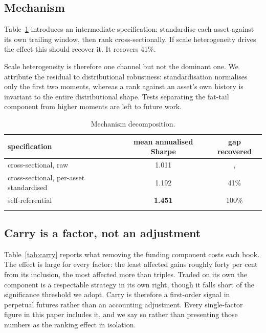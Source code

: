 \documentclass[11pt,letterpaper]{article}
\begin{document}
\subsection{Mechanism}

Table~\ref{tab:mech} introduces an intermediate specification: standardise each
asset against its own trailing window, then rank cross-sectionally. If scale
heterogeneity drives the effect this should recover it. It recovers 41\%.

Scale heterogeneity is therefore one channel but not the dominant one. We
attribute the residual to distributional robustness: standardisation normalises
only the first two moments, whereas a rank against an asset's own history is
invariant to the entire distributional shape. Tests separating the fat-tail
component from higher moments are left to future work.

\begin{table}[!htbp]\centering
\caption{Mechanism decomposition.}\label{tab:mech}
\begin{tabular}{lcc}
\toprule
specification & mean annualised Sharpe & gap recovered \\
\midrule\addlinespace[2pt]
cross-sectional, raw & 1.011 & , \\
cross-sectional, per-asset standardised & 1.192 & 41\% \\
self-referential & \textbf{1.451} & 100\% \\
\addlinespace[2pt]
\bottomrule
\end{tabular}
\end{table}

\subsection{Carry is a factor, not an adjustment}
\label{sec:carry}

Table~\ref{tab:carry} reports what removing the funding component costs each
book. The effect is large for every factor: the least affected gains roughly
forty per cent from its inclusion, the most affected more than triples. Traded on its own the component is a respectable strategy in its own right,
though it falls short of the significance threshold we adopt. Carry is therefore
a first-order signal in perpetual futures rather than an accounting adjustment.
Every single-factor figure in this paper includes it, and we say so rather than
presenting those numbers as the ranking effect in isolation.
\end{document}

